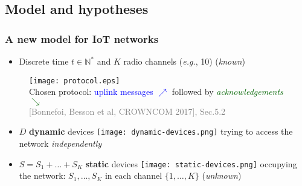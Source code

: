 \subsection{Model and hypotheses}

\subsubsection{A new model for IoT networks}

\begin{frameO}

    \begin{itemize}
        \item
              Discrete time \(t\in\mathbb{N}^*\) and \(K\) radio channels (\emph{e.g.}, 10)
              \hfill{} (\emph{known})
    \end{itemize}

    \begin{figure}[h!]
        \centering
        \texttt{[image: protocol.eps]}\\
        
        {\small Chosen protocol: \textcolor{blue}{uplink messages {\large $\nearrow$}} followed by \textcolor{darkgreen}{\emph{acknowledgements} {\large $\searrow$}}}\\
        \hfill{} {\tiny \textcolor{gray}{[Bonnefoi, Besson et al, CROWNCOM 2017], Sec.5.2}}
    \end{figure}

    \begin{itemize}
        \item
              \(D\) \textbf{dynamic} devices \texttt{[image: dynamic-devices.png]} trying to access the network \emph{independently}
        \item
              \(S=S_1+\dots+S_{K}\) \textbf{static} devices \texttt{[image: static-devices.png]} occupying the network:
              \newline
              \(S_1,\dots,S_{K}\) in each channel \(\{1,\dots,K\}\) \hfill{} (\emph{unknown})
    \end{itemize}

\end{frameO}


\begin{frameO}

    \begin{center}
    \end{center}

\end{frameO}


